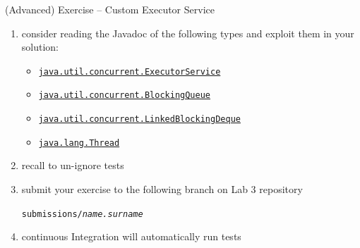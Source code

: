 \documentclass{beamer}\mode<presentation>{\usetheme{AMSBolognaFC}}
\begin{document}
\begin{frame}[c,allowframebreaks]{(Advanced) Exercise \currentExercise{} -- Custom Executor Service}
\begin{enumerate}
		\bigskip

		\item consider reading the Javadoc of the following types and exploit them in your solution:
		\begin{itemize}
			\item \href{https://docs.oracle.com/javase/8/docs/api/java/util/concurrent/ExecutorService.html}{\texttt{java.util.concurrent.ExecutorService}}
			\item \href{https://docs.oracle.com/javase/8/docs/api/java/util/concurrent/BlockingQueue.html}{\texttt{java.util.concurrent.BlockingQueue}}
			\item \href{https://docs.oracle.com/javase/8/docs/api/java/util/concurrent/LinkedBlockingDeque.html}{\texttt{java.util.concurrent.LinkedBlockingDeque}}
			\item \href{https://docs.oracle.com/javase/8/docs/api/java/lang/Thread.html}{\texttt{java.lang.Thread}}
		\end{itemize}

        \bigskip

        \item recall to un-ignore tests

        \bigskip

        \item submit your exercise to the following branch on Lab 3 repository
        \begin{center}
            \texttt{submissions/\textit{name.surname}}
        \end{center}

        \bigskip

        \item continuous Integration will automatically run tests

	\end{enumerate}

\end{frame}

\section*{}
\end{document}

